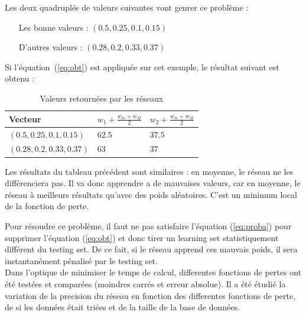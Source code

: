 \exemle
{
Les deux quadruplés de valeurs suivantes vont genrer ce problème :
\begin{itemize}
    \item[Les bonne valeurs :] $(0.5, 0.25, 0.1, 0.15)$
    \item[D'autres valeurs :] $(0.28, 0.2, 0.33, 0.37)$
\end{itemize}
Si l'équation\ (\ref{eq:obt}) est appliquée sur cet exemple, le résultat suivant est obtenu :
\begin{table}[H]
    \centering
    \begin{tabular}{|l|l|l|}
        \hline
        Vecteur & $w_1 + \frac{w_m + w_M}{2}$ & $w_2 + \frac{w_m + w_M}{2}$ \\ \hline \hline
        $(0.5, 0.25, 0.1, 0.15)$  & $62.5$ & $37.5$ \\ \hline
        $(0.28, 0.2, 0.33, 0.37)$ &  $63$  &  $37$  \\ \hline
    \end{tabular}
    \label{tab:pb_tab}
    \caption{Valeurs retournées par les réseaux}
\end{table}
Les résultats du tableau précédent sont similaires :
en moyenne, le réseau ne les différenciera pas.
Il va donc apprendre a de mauvaises valeurs,
car en moyenne, le réseau à meilleurs résultats qu'avec des poids aléatoires.
C'est un minimum local de la fonction de perte.
}


Pour résoudre ce problème, il faut ne pas satisfaire l'équation (\ref{eq:proba})
pour supprimer l'équation (\ref{eq:obt}) et donc tirer un learning
set statistiquement différent du testing set.
De ce fait, si le réseau apprend ces mauvais poids, il sera instantanément pénalisé par le testing set.\\


Dans l'optique de minimiser le temps de calcul,
differentes fonctions de pertes ont été testées et comparées
(moindres carrés et erreur absolue).
Il a été étudié la variation de la precision du réseau en fonction des differentes fonctions de perte,
de si les données était triées et de la taille de la base de données.
